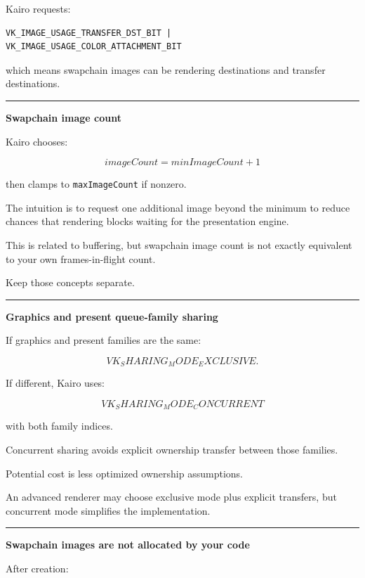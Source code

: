 Kairo requests:

\begin{verbatim}
VK_IMAGE_USAGE_TRANSFER_DST_BIT |
VK_IMAGE_USAGE_COLOR_ATTACHMENT_BIT
\end{verbatim}

which means swapchain images can be rendering destinations and transfer destinations.

\begin{center}\rule{0.5\linewidth}{0.5pt}\end{center}

\textbf{Swapchain image count}

Kairo chooses:

\[
imageCount=
minImageCount+1
\]

then clamps to \texttt{maxImageCount} if nonzero.

The intuition is to request one additional image beyond the minimum to reduce chances that rendering blocks waiting for the presentation engine.

This is related to buffering, but swapchain image count is not exactly equivalent to your own frames-in-flight count.

Keep those concepts separate.

\begin{center}\rule{0.5\linewidth}{0.5pt}\end{center}

\textbf{Graphics and present queue-family sharing}

If graphics and present families are the same:

\[
VK_SHARING_MODE_EXCLUSIVE.
\]

If different, Kairo uses:

\[
VK_SHARING_MODE_CONCURRENT
\]

with both family indices.

Concurrent sharing avoids explicit ownership transfer between those families.

Potential cost is less optimized ownership assumptions.

An advanced renderer may choose exclusive mode plus explicit transfers, but concurrent mode simplifies the implementation.

\begin{center}\rule{0.5\linewidth}{0.5pt}\end{center}

\textbf{Swapchain images are not allocated by your code}

After creation:

